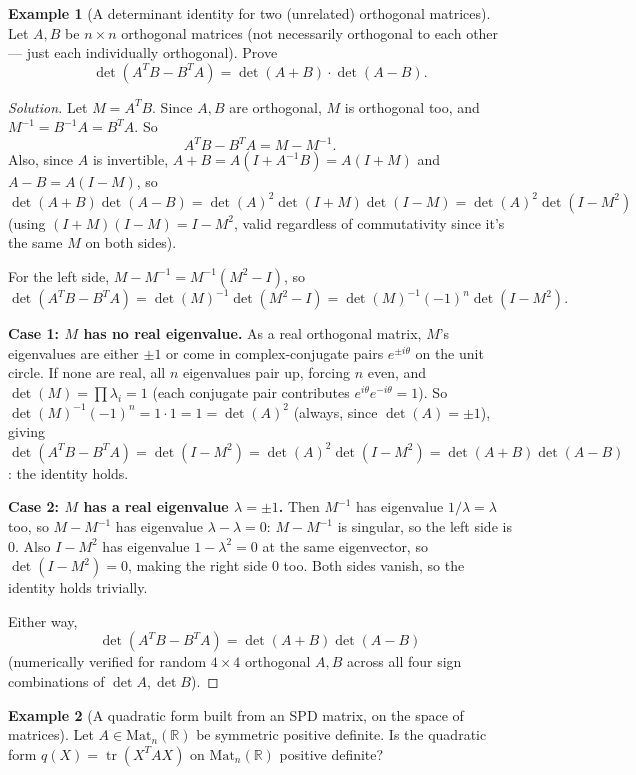 \documentclass[11pt]{article}
\theoremstyle{definition}
\newtheorem{example}{Example}[section]
\newcommand{\R}{\mathbb{R}}
\newcommand{\trace}{\operatorname{tr}}
\begin{document}
\begin{example}[A determinant identity for two (unrelated) orthogonal matrices]
Let $A,B$ be $n\times n$ orthogonal matrices (not necessarily orthogonal to each other — just each individually orthogonal). Prove
\[
\det(A^TB-B^TA)=\det(A+B)\cdot\det(A-B).
\]
\end{example}

\begin{proof}[Solution]
Let $M=A^TB$. Since $A,B$ are orthogonal, $M$ is orthogonal too, and $M^{-1}=B^{-1}A=B^TA$. So
\[
A^TB-B^TA = M - M^{-1}.
\]
Also, since $A$ is invertible, $A+B=A(I+A^{-1}B)=A(I+M)$ and $A-B=A(I-M)$, so
\[
\det(A+B)\det(A-B) = \det(A)^2\det(I+M)\det(I-M) = \det(A)^2\det(I-M^2)
\]
(using $(I+M)(I-M)=I-M^2$, valid regardless of commutativity since it's the same $M$ on both sides).

For the left side, $M-M^{-1}=M^{-1}(M^2-I)$, so
\[
\det(A^TB-B^TA)=\det(M)^{-1}\det(M^2-I) = \det(M)^{-1}(-1)^n\det(I-M^2).
\]

\textbf{Case 1: $M$ has no real eigenvalue.} As a real orthogonal matrix, $M$'s eigenvalues are either $\pm1$ or come in complex-conjugate pairs $e^{\pm i\theta}$ on the unit circle. If none are real, all $n$ eigenvalues pair up, forcing $n$ even, and $\det(M)=\prod\lambda_i=1$ (each conjugate pair contributes $e^{i\theta}e^{-i\theta}=1$). So $\det(M)^{-1}(-1)^n=1\cdot1=1=\det(A)^2$ (always, since $\det(A)=\pm1$), giving $\det(A^TB-B^TA)=\det(I-M^2)=\det(A)^2\det(I-M^2)=\det(A+B)\det(A-B)$: the identity holds.

\textbf{Case 2: $M$ has a real eigenvalue $\lambda=\pm1$.} Then $M^{-1}$ has eigenvalue $1/\lambda=\lambda$ too, so $M-M^{-1}$ has eigenvalue $\lambda-\lambda=0$: $M-M^{-1}$ is singular, so the left side is $0$. Also $I-M^2$ has eigenvalue $1-\lambda^2=0$ at the same eigenvector, so $\det(I-M^2)=0$, making the right side $0$ too. Both sides vanish, so the identity holds trivially.

Either way,
\[
\boxed{\det(A^TB-B^TA)=\det(A+B)\det(A-B)}
\]
(numerically verified for random $4\times4$ orthogonal $A,B$ across all four sign combinations of $\det A,\det B$).
\end{proof}

\begin{example}[A quadratic form built from an SPD matrix, on the space of matrices]
Let $A\in\mathrm{Mat}_n(\R)$ be symmetric positive definite. Is the quadratic form $q(X)=\trace(X^TAX)$ on $\mathrm{Mat}_n(\R)$ positive definite?
\end{example}
\end{document}

